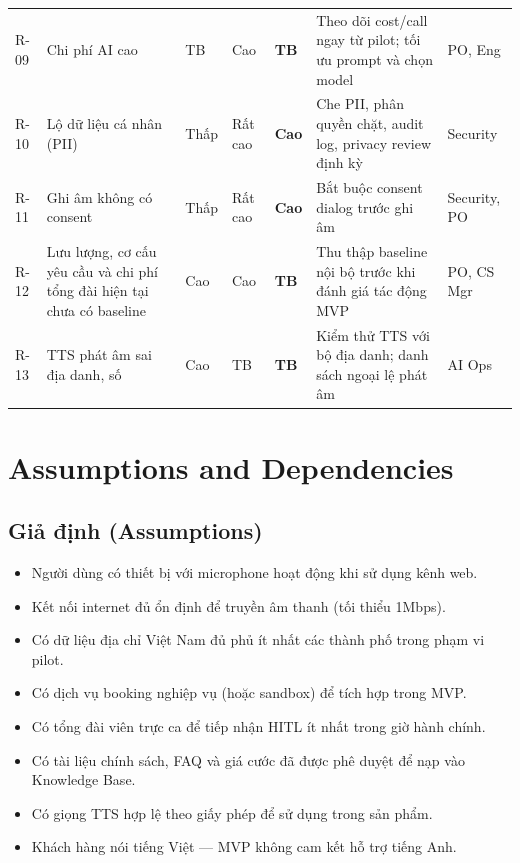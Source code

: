 \documentclass[12pt,a4paper]{article}
\newcommand{\riskhigh}{\colorbox{RiskHigh}{\small\textbf{Cao}}}
\newcommand{\riskmed}{\colorbox{RiskMed}{\small\textbf{TB}}}
\begin{document}
\begin{longtable}{C{1.2cm} L{3cm} C{1.5cm} C{1.5cm} C{1.5cm} L{4cm} L{2cm}}
  R-09 & Chi phí AI cao & TB & Cao & \riskmed & Theo dõi cost/call ngay từ pilot; tối ưu prompt và chọn model & PO, Eng \\
  R-10 & Lộ dữ liệu cá nhân (PII) & Thấp & Rất cao & \riskhigh & Che PII, phân quyền chặt, audit log, privacy review định kỳ & Security \\
  R-11 & Ghi âm không có consent & Thấp & Rất cao & \riskhigh & Bắt buộc consent dialog trước ghi âm & Security, PO \\
  R-12 & Lưu lượng, cơ cấu yêu cầu và chi phí tổng đài hiện tại chưa có baseline & Cao & Cao & \riskmed & Thu thập baseline nội bộ trước khi đánh giá tác động MVP & PO, CS Mgr \\
  R-13 & TTS phát âm sai địa danh, số & Cao & TB & \riskmed & Kiểm thử TTS với bộ địa danh; danh sách ngoại lệ phát âm & AI Ops \\
\end{longtable}
\normalsize

\section{Assumptions and Dependencies}

\subsection{Giả định (Assumptions)}
\begin{itemize}
  \item Người dùng có thiết bị với microphone hoạt động khi sử dụng kênh web.
  \item Kết nối internet đủ ổn định để truyền âm thanh (tối thiểu 1Mbps).
  \item Có dữ liệu địa chỉ Việt Nam đủ phủ ít nhất các thành phố trong phạm vi pilot.
  \item Có dịch vụ booking nghiệp vụ (hoặc sandbox) để tích hợp trong MVP.
  \item Có tổng đài viên trực ca để tiếp nhận HITL ít nhất trong giờ hành chính.
  \item Có tài liệu chính sách, FAQ và giá cước đã được phê duyệt để nạp vào Knowledge Base.
  \item Có giọng TTS hợp lệ theo giấy phép để sử dụng trong sản phẩm.
  \item Khách hàng nói tiếng Việt --- MVP không cam kết hỗ trợ tiếng Anh.
\end{itemize}
\end{document}
